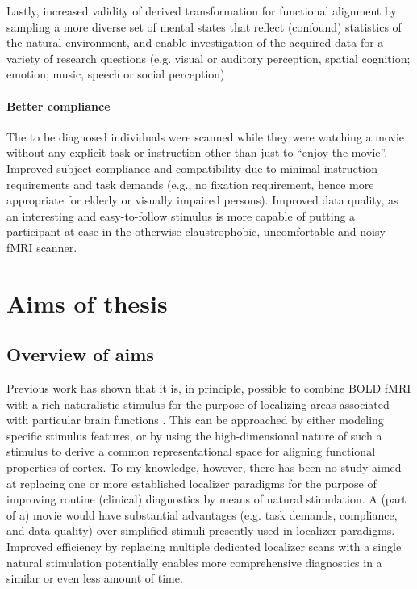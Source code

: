 %
Lastly, increased validity of derived transformation for functional alignment by
sampling a more diverse set of mental states that reflect (confound) statistics
of the natural environment, and enable investigation of the acquired data for a
variety of research questions (e.g. visual or auditory perception, spatial
cognition; emotion; music, speech or social perception)


\paragraph{Better compliance}
%
The to be diagnosed individuals were scanned while they were watching a movie
without any explicit task or instruction other than just to ``enjoy the movie''.
%
Improved subject compliance and compatibility due to minimal instruction
requirements and task demands (e.g., no fixation requirement, hence more
appropriate for elderly or visually impaired persons).
%
Improved data quality, as an interesting and easy-to-follow stimulus is more
capable of putting a participant at ease in the otherwise claustrophobic,
uncomfortable and noisy fMRI scanner.


\section{Aims of thesis}


\subsection{Overview of aims}
%
Previous work has shown that it is, in principle, possible to combine BOLD fMRI
with a rich naturalistic stimulus for the purpose of localizing areas associated
with particular brain functions \citep{bartels2004mapping}.
%
This can be approached by either modeling specific stimulus features, or by
using the high-dimensional nature of such a stimulus to derive a common
representational space for aligning functional properties of cortex.
%
To my knowledge, however, there has been no study aimed at replacing one or more
established localizer paradigms for the purpose of improving routine (clinical)
diagnostics by means of natural stimulation.
%
A (part of a) movie would have substantial advantages (e.g.  task demands,
compliance, and data quality) over simplified stimuli presently used in
localizer paradigms.
%
Improved efficiency by replacing multiple dedicated localizer scans with a
single natural stimulation potentially enables more comprehensive diagnostics in
a similar or even less amount of time.

